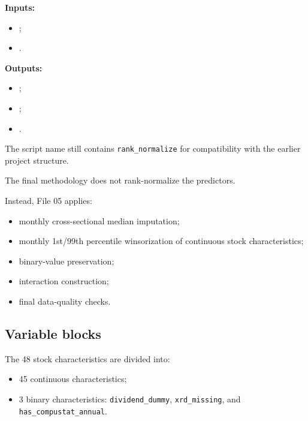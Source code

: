 \documentclass[11pt,a4paper]{article}
\newcommand{\code}[1]{\texttt{#1}}
\begin{document}
\textbf{Inputs:}

\begin{itemize}
  \item {};
  \item {}.
\end{itemize}

\textbf{Outputs:}

\begin{itemize}
  \item {};
  \item {};
  \item {}.
\end{itemize}

The script name still contains \code{rank\_normalize} for compatibility with the
earlier project structure.

The final methodology does not rank-normalize the predictors.

Instead, File 05 applies:

\begin{itemize}
  \item monthly cross-sectional median imputation;
  \item monthly 1st/99th percentile winsorization of continuous stock
        characteristics;
  \item binary-value preservation;
  \item interaction construction;
  \item final data-quality checks.
\end{itemize}

\subsection{Variable blocks}

The 48 stock characteristics are divided into:

\begin{itemize}
  \item 45 continuous characteristics;
  \item 3 binary characteristics:
        \code{dividend\_dummy},
        \code{xrd\_missing}, and
        \code{has\_compustat\_annual}.
\end{itemize}
\end{document}
